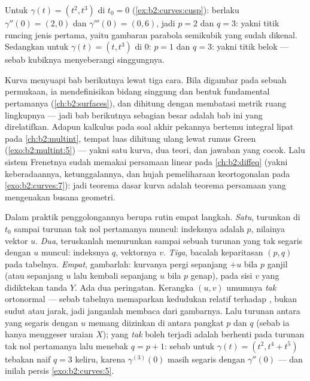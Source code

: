 \begin{example}
Untuk $\gamma(t) = (t^2, t^3)$ di $t_0 = 0$
(\cref{ex:b2:curves:cusp}): berlaku $\gamma'' (0)= (2, 0)$ dan $\gamma'''(0) =
(0, 6)$, jadi $p = 2$ dan $q = 3$: yakni titik runcing jenis pertama, yaitu
gambaran parabola semikubik yang sudah dikenal. Sedangkan untuk $\gamma(t) = (t,
t^3)$ di $0$: $p = 1$ dan $q = 3$: yakni titik belok --- sebab kubiknya menyeberangi
singgungnya.
\end{example}

\begin{remark}
Kurva menyuapi bab berikutnya lewat tiga cara. Bila digambar pada sebuah
permukaan, ia mendefinisikan bidang singgung dan bentuk fundamental
pertamanya (\cref{ch:b2:surfaces}), dan 
dihitung dengan membatasi metrik ruang lingkupnya --- jadi
bab berikutnya sebagian besar adalah bab ini yang direlatifkan. Adapun
kalkulus  pada soal akhir pekannya bertemu integral
lipat pada \cref{ch:b2:multint}, tempat luas 
dihitung ulang lewat rumus Green
(\cref{exo:b2:multint:5}) --- yakni satu kurva, dua teori, dan
jawaban yang cocok. Lalu sistem Frenetnya sudah memakai
persamaan  linear pada \cref{ch:b2:diffeq}
(yakni keberadaannya, ketunggalannya, dan hujah pemeliharaan keortogonalan
pada \cref{exo:b2:curves:7}): jadi teorema dasar
kurva adalah teorema persamaan  yang mengenakan
busana geometri.
\end{remark}

\begin{remark}
Dalam praktik penggolongannya berupa rutin empat langkah.
\emph{Satu}, turunkan di $t_0$ sampai turunan tak nol
pertamanya muncul: indeksnya adalah $p$, nilainya vektor
$u$. \emph{Dua}, teruskanlah menurunkan sampai sebuah turunan
yang tak segaris dengan $u$ muncul: indeksnya $q$, vektornya $v$.
\emph{Tiga}, bacalah keparitasan $(p, q)$ pada tabelnya.
\emph{Empat}, gambarlah: kurvanya pergi sepanjang $+u$ bila $p$ ganjil
(atau sepanjang $u$ lalu kembali sepanjang $u$ bila $p$ genap), pada sisi
$v$ yang didiktekan tanda $Y$. Ada dua peringatan. Kerangka
$(u, v)$ umumnya \emph{tak} ortonormal --- sebab tabelnya
memaparkan kedudukan relatif terhadap , bukan sudut
atau jarak, jadi janganlah membaca  dari gambarnya.
Lalu turunan antara yang segaris dengan $u$ memang diizinkan
di antara pangkat $p$ dan $q$ (sebab ia hanya menggeser uraian
$X$); yang \emph{tak} boleh terjadi adalah berhenti pada turunan
tak nol pertamanya lalu menebak $q = p + 1$: sebab untuk $\gamma(t)
= (t^2, t^4 + t^5)$ tebakan naif $q = 3$ keliru, karena
$\gamma^{(3)}(0)$ masih segaris dengan $\gamma''(0)$ ---
dan inilah persis \cref{exo:b2:curves:5}.
\end{remark}


